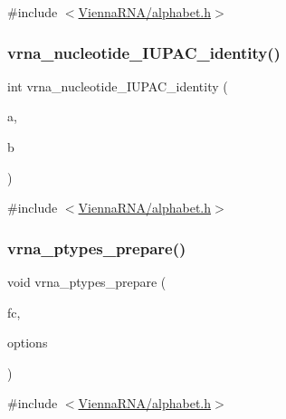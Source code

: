 {\ttfamily \#include $<$\mbox{\hyperlink{alphabet_8h}{Vienna\+R\+N\+A/alphabet.\+h}}$>$}

\mbox{\label{group__utils_ga2ee2b98985e6335910f128c81c8f5842}} 
\subsubsection{\texorpdfstring{vrna\+\_\+nucleotide\+\_\+\+I\+U\+P\+A\+C\+\_\+identity()}{vrna\_nucleotide\_IUPAC\_identity()}}
{\footnotesize\ttfamily int vrna\+\_\+nucleotide\+\_\+\+I\+U\+P\+A\+C\+\_\+identity (\begin{DoxyParamCaption}\item[{char}]{a,  }\item[{char}]{b }\end{DoxyParamCaption})}



{\ttfamily \#include $<$\mbox{\hyperlink{alphabet_8h}{Vienna\+R\+N\+A/alphabet.\+h}}$>$}

\mbox{\label{group__utils_gafa82673941b3bbb8006e9ca105fa33b9}} 
\subsubsection{\texorpdfstring{vrna\+\_\+ptypes\+\_\+prepare()}{vrna\_ptypes\_prepare()}}
{\footnotesize\ttfamily void vrna\+\_\+ptypes\+\_\+prepare (\begin{DoxyParamCaption}\item[{\mbox{\hyperlink{group__fold__compound_ga1b0cef17fd40466cef5968eaeeff6166}{vrna\+\_\+fold\+\_\+compound\+\_\+t}} $\ast$}]{fc,  }\item[{unsigned int}]{options }\end{DoxyParamCaption})}



{\ttfamily \#include $<$\mbox{\hyperlink{alphabet_8h}{Vienna\+R\+N\+A/alphabet.\+h}}$>$}

\mbox{\label{group__utils_ga51a9e86a5f731f5f2f5584ee67cee4a8}} 
